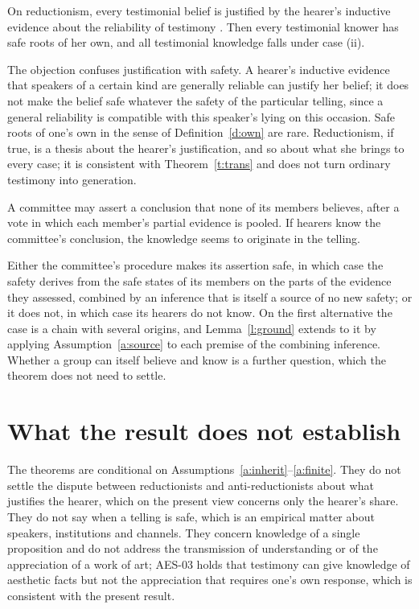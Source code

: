 \documentclass{situationist-preprint}
\begin{document}
\begin{objection}[Reductionism]
On reductionism, every testimonial belief is justified by the hearer's inductive evidence about the reliability of testimony \citep{Fricker1995}. Then every testimonial knower has safe roots of her own, and all testimonial knowledge falls under case (ii).
\end{objection}

\begin{reply}
The objection confuses justification with safety. A hearer's inductive evidence that speakers of a certain kind are generally reliable can justify her belief; it does not make the belief safe whatever the safety of the particular telling, since a general reliability is compatible with this speaker's lying on this occasion. Safe roots of one's own in the sense of Definition~\ref{d:own} are rare. Reductionism, if true, is a thesis about the hearer's justification, and so about what she brings to every case; it is consistent with Theorem~\ref{t:trans} and does not turn ordinary testimony into generation.
\end{reply}

\begin{objection}
A committee may assert a conclusion that none of its members believes, after a vote in which each member's partial evidence is pooled. If hearers know the committee's conclusion, the knowledge seems to originate in the telling.
\end{objection}

\begin{reply}
Either the committee's procedure makes its assertion safe, in which case the safety derives from the safe states of its members on the parts of the evidence they assessed, combined by an inference that is itself a source of no new safety; or it does not, in which case its hearers do not know. On the first alternative the case is a chain with several origins, and Lemma~\ref{l:ground} extends to it by applying Assumption~\ref{a:source} to each premise of the combining inference. Whether a group can itself believe and know is a further question, which the theorem does not need to settle.
\end{reply}

\section{What the result does not establish}

The theorems are conditional on Assumptions~\ref{a:inherit}--\ref{a:finite}. They do not settle the dispute between reductionists and anti-reductionists about what justifies the hearer, which on the present view concerns only the hearer's share. They do not say when a telling is safe, which is an empirical matter about speakers, institutions and channels. They concern knowledge of a single proposition and do not address the transmission of understanding or of the appreciation of a work of art; AES-03 holds that testimony can give knowledge of aesthetic facts but not the appreciation that requires one's own response, which is consistent with the present result.
\end{document}
